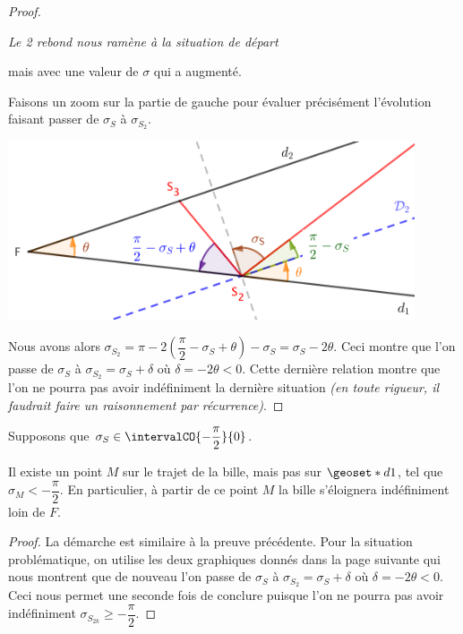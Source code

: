 \begin{proof}
\begin{center}
		\itshape\small
		Le 2\ieme{} rebond nous ramène à la situation de départ
		
		mais avec une valeur de $\sigma$ qui a augmenté.
	\end{center}
	
	
	\medskip
	
	Faisons un zoom sur la partie de gauche pour évaluer précisément l'évolution faisant passer de $\sigma_S$ à $\sigma_{S_2}$.
	
	\begin{center}
		\includegraphics[width=12cm]{basic-math-pool/proof-starting-with-d2-2-bounces-to-F-zoom.png}
	\end{center}
	
	
	\medskip
	
	Nous avons alors $\sigma_{S_2} = \pi - 2 \left( \dfrac{\pi}{2} - \sigma_S + \theta \right) - \sigma_S = \sigma_S - 2 \theta$.
	Ceci montre que l'on passe de $\sigma_S$ à $\sigma_{S_2} = \sigma_S + \delta$ où $\delta = - 2 \theta < 0$. Cette dernière relation montre que l'on ne pourra pas avoir indéfiniment la dernière situation \emph{(en toute rigueur, il faudrait faire un raisonnement par récurrence)}.  
\end{proof}


\medskip


\begin{fact} \label{s-eloigner}
	Supposons que $\sigma_S \in \intervalCO{- \dfrac{\pi}{2}}{0}$.

	\medskip
	
	Il existe un point $M$ sur le trajet de la bille, mais pas sur $\geoset*{d}{1}$, tel que $\sigma_M < - \dfrac{\pi}{2}$. En particulier, à partir de ce point $M$ la bille s'éloignera indéfiniment loin de $F$.
\end{fact}

\begin{proof}
	La démarche est similaire à la preuve précédente.
	Pour la situation problématique, on utilise les deux graphiques donnés dans la page suivante qui nous montrent que de nouveau l'on passe de $\sigma_S$ à $\sigma_{S_2} = \sigma_S + \delta$ où $\delta = - 2 \theta < 0$. Ceci nous permet une seconde fois de conclure puisque l'on ne pourra pas avoir indéfiniment $\sigma_{S_{2k}} \geqslant - \dfrac{\pi}{2}$.
\end{proof}


